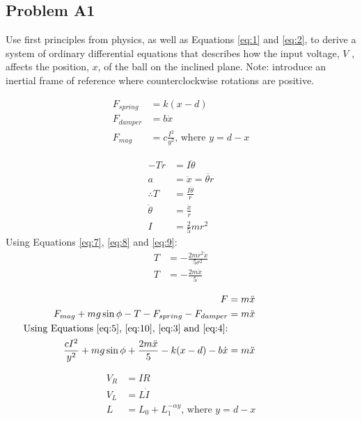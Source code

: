 \subsection*{Problem A1}\label{sec:q1} Use first principles from physics, as well as Equations \eqref{eq:1} and \eqref{eq:2}, to derive a system of ordinary differential equations that describes how the input voltage, \(V\) , affects the position, \(x\), of the ball on the inclined plane. Note: introduce an inertial frame of reference where counterclockwise rotations are positive.
    
    \begin{align}
        F_{spring} &= k(x - d)\label{eq:3}\\
        F_{damper} &= b\dot{x}\label{eq:4}\\
        F_{mag} &= c \frac{I^2}{y^2} \text{, where } y = d - x \label{eq:5}
    \end{align}

    \begin{align}
        -Tr &= I\ddot{\theta}\\
        a &= \ddot{x} = \ddot{\theta r}\nonumber\\
        \therefore T &= \frac{I \ddot{\theta}}{r}\label{eq:7}\\
        \ddot{\theta} &= \frac{\ddot{x}}{r}\label{eq:8}\\
        I &= \frac{2}{5} mr^2\label{eq:9}
    \end{align}
    Using Equations \eqref{eq:7}, \eqref{eq:8} and  \eqref{eq:9}:
    \begin{align}
        T &= - \frac{2mr^2 \ddot{x}}{5r^2} \nonumber \\
        T &= - \frac{2m \ddot{x}}{5} \label{eq:10}
    \end{align}
    
    \begin{align}
        F &= m \ddot{x} \hspace{3cm}\nonumber \\
        F_{mag} + mg \sin{\phi} - T - F_{spring} - F_{damper} &= m \ddot{x} \nonumber \\
        \text{Using Equations \eqref{eq:5}, \eqref{eq:10}, \eqref{eq:3} and  \eqref{eq:4}:}\nonumber \\
        \frac{cI^2}{y^2} + mg \sin{\phi} + \frac{2m \ddot{x}}{5} - k(x - d) - b \dot{x} &= m \ddot{x} \label{eq:11} 
    \end{align}
    
    \begin{align}
        V_{R} &= IR\label{eq:12}\\
        V_{L} &= L \dot{I}\label{eq:13}\\
        L &= L_{0} + L_{1}^{- \alpha y} \text{, where } y = d - x \label{eq:13}
    \end{align}
    

